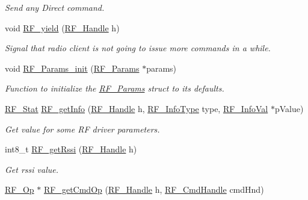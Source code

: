 \begin{DoxyCompactItemize}
\begin{DoxyCompactList}\small\item\em Send any Direct command. ~\newline
 \end{DoxyCompactList}\item 
void \hyperlink{_r_f_8h_a299ada7963c727a40466d7d1bb7296a3}{R\+F\+\_\+yield} (\hyperlink{_r_f_8h_a5e8ab7fc87fb818f435d9b6226ee573f}{R\+F\+\_\+\+Handle} h)
\begin{DoxyCompactList}\small\item\em Signal that radio client is not going to issue more commands in a while. ~\newline
 \end{DoxyCompactList}\item 
void \hyperlink{_r_f_8h_ab956de3745437cb7a69c4edfb006434e}{R\+F\+\_\+\+Params\+\_\+init} (\hyperlink{struct_r_f___params}{R\+F\+\_\+\+Params} $\ast$params)
\begin{DoxyCompactList}\small\item\em Function to initialize the \hyperlink{struct_r_f___params}{R\+F\+\_\+\+Params} struct to its defaults. \end{DoxyCompactList}\item 
\hyperlink{_r_f_8h_afdc219ddabc8427ecd552a6c78d9988f}{R\+F\+\_\+\+Stat} \hyperlink{_r_f_8h_a4bd7985a3e0c5ad2b9f5e94aa945db63}{R\+F\+\_\+get\+Info} (\hyperlink{_r_f_8h_a5e8ab7fc87fb818f435d9b6226ee573f}{R\+F\+\_\+\+Handle} h, \hyperlink{_r_f_8h_a22596109459422a7a4d4f386dffbb8fa}{R\+F\+\_\+\+Info\+Type} type, \hyperlink{union_r_f___info_val}{R\+F\+\_\+\+Info\+Val} $\ast$p\+Value)
\begin{DoxyCompactList}\small\item\em Get value for some R\+F driver parameters. ~\newline
 \end{DoxyCompactList}\item 
int8\+\_\+t \hyperlink{_r_f_8h_ac3fe0d39243fb6bbefe0216d958a6779}{R\+F\+\_\+get\+Rssi} (\hyperlink{_r_f_8h_a5e8ab7fc87fb818f435d9b6226ee573f}{R\+F\+\_\+\+Handle} h)
\begin{DoxyCompactList}\small\item\em Get rssi value. \end{DoxyCompactList}\item 
\hyperlink{_r_f_8h_a47ea3dea78019340e8f8ceb854de5f02}{R\+F\+\_\+\+Op} $\ast$ \hyperlink{_r_f_8h_abdde833057385980d0ae1b2c844b97b7}{R\+F\+\_\+get\+Cmd\+Op} (\hyperlink{_r_f_8h_a5e8ab7fc87fb818f435d9b6226ee573f}{R\+F\+\_\+\+Handle} h, \hyperlink{_r_f_8h_acab1f56c62a9fd1ad0a91a46b6da23f1}{R\+F\+\_\+\+Cmd\+Handle} cmd\+Hnd)

\end{DoxyCompactItemize}
